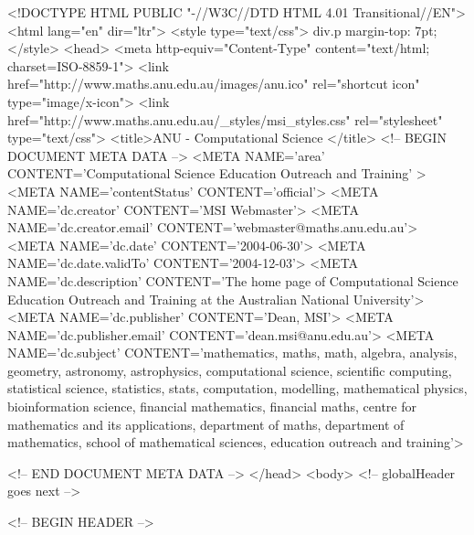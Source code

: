 \begin{html}
<!DOCTYPE HTML PUBLIC "-//W3C//DTD HTML 4.01 Transitional//EN">
<html lang="en" dir="ltr">
<style type="text/css"> div.p { margin-top: 7pt;}</style>
<head>
<meta http-equiv="Content-Type" content="text/html; charset=ISO-8859-1">
<link href="http://www.maths.anu.edu.au/images/anu.ico" rel="shortcut icon" type="image/x-icon">
<link href="http://www.maths.anu.edu.au/_styles/msi_styles.css" rel="stylesheet" type="text/css">
<title>ANU - Computational Science </title>
<!-- BEGIN DOCUMENT META DATA -->
<META NAME='area' CONTENT='Computational Science Education Outreach and Training' >
<META NAME='contentStatus' CONTENT='official'>
<META NAME='dc.creator' CONTENT='MSI Webmaster'>
<META NAME='dc.creator.email' CONTENT='webmaster@maths.anu.edu.au'>
<META NAME='dc.date' CONTENT='2004-06-30'>
<META NAME='dc.date.validTo' CONTENT='2004-12-03'>
<META NAME='dc.description' CONTENT='The home page of
Computational Science Education Outreach and Training at the Australian National University'>
<META NAME='dc.publisher' CONTENT='Dean, MSI'>
<META NAME='dc.publisher.email' CONTENT='dean.msi@anu.edu.au'>
<META NAME='dc.subject' CONTENT='mathematics, maths, math, algebra,
analysis, geometry, astronomy, astrophysics, computational science,
scientific computing,
statistical science, statistics, stats, computation, modelling,
mathematical physics, bioinformation science, financial mathematics,
financial maths, centre for mathematics and its applications,
department of maths, department of mathematics, school of mathematical
sciences, education outreach and training'>

<!-- END DOCUMENT META DATA -->
</head>
<body>
<!-- globalHeader goes next -->



<!-- BEGIN HEADER -->


\end{html}
